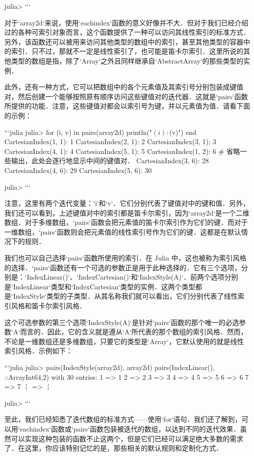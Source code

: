 julia> 
```

对于`array2d`来说，使用`eachindex`函数的意义好像并不大．但对于我们已经介绍过的各种可索引对象而言，这个函数提供了一种可以访问其线性索引的标准方式．另外，该函数还可以被用来访问其他类型的数组中的索引，甚至其他类型的容器中的索引．只不过，那就不一定是线性索引了，也可能是笛卡尔索引．这里所说的其他类型的数组是指，除了`Array`之外且同样继承自`AbstractArray`的那些类型的实例．

此外，还有一种方式，它可以把数组中的各个元素值及其索引号分别包装成键值对，然后创建一个能够按照原有顺序访问这些键值对的迭代器．这就是`pairs`函数所提供的功能．注意，这些键值对都会以索引号为键，并以元素值为值．请看下面的示例：

```julia
julia> for (i, v) in pairs(array2d)
           println("$(i): $(v)")
       end
CartesianIndex(1, 1): 1
CartesianIndex(2, 1): 2
CartesianIndex(3, 1): 3
CartesianIndex(4, 1): 4
CartesianIndex(5, 1): 5
CartesianIndex(1, 2): 6
# 省略一些输出，此处会逐行地显示中间的键值对．
CartesianIndex(3, 6): 28
CartesianIndex(4, 6): 29
CartesianIndex(5, 6): 30

julia> 
```

注意，这里有两个迭代变量：`i`和`v`．它们分别代表了键值对中的键和值．另外，我们还可以看到，上述键值对中的索引都是笛卡尔索引，因为`array2d`是一个二维数组．对于多维数组，`pairs`函数会把元素值的笛卡尔索引作为它们的键．而对于一维数组，`pairs`函数则会把元素值的线性索引号作为它们的键．这都是在默认情况下的规则．

我们也可以自己选择`pairs`函数所使用的索引．在 Julia 中，这也被称为索引风格的选择．`pairs`函数还有一个可选的参数正是用于此种选择的．它有三个选项，分别是：`IndexLinear()`、`IndexCartesian()`和`IndexStyle(A)`．前两个选项分别是`IndexLinear`类型和`IndexCartesian`类型的实例．这两个类型都是`IndexStyle`类型的子类型．从其名称我们就可以看出，它们分别代表了线性索引风格和笛卡尔索引风格．

这个可选参数的第三个选项`IndexStyle(A)`是针对`pairs`函数的那个唯一的必选参数`A`而言的．因此，它的含义就是遵从`A`所代表的那个数组的索引风格．然而，不论是一维数组还是多维数组，只要它的类型是`Array`，它默认使用的就是线性索引风格．示例如下：

```julia
julia> pairs(IndexStyle(array2d), array2d)
pairs(IndexLinear(), ::Array{Int64,2}) with 30 entries:
  1 => 1
  2 => 2
  3 => 3
  4 => 4
  5 => 5
  6 => 6
  7 => 7
  ⋮ => ⋮

julia> 
```

至此，我们已经知悉了迭代数组的标准方式——使用`for`语句．我们还了解到，可以用`eachindex`函数或`pairs`函数包装被迭代的数组，以达到不同的迭代效果．虽然可以实现这种包装的函数不止这两个，但是它们已经可以满足绝大多数的需求了．在这里，你应该特别记忆的是，那些相关的默认规则和定制化方式．

